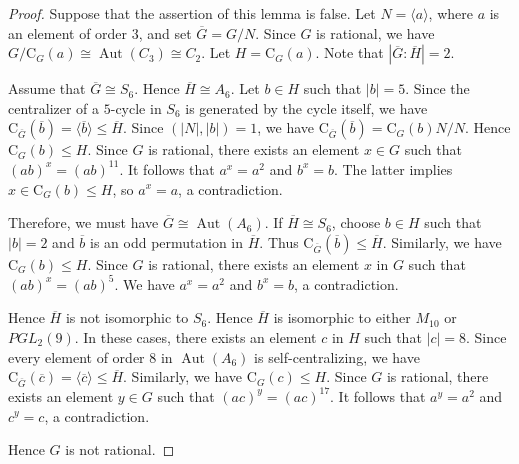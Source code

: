 \documentclass[10pt,a4paper]{amsart}
\providecommand{\Aut}{{\operatorname{Aut}}}
\providecommand{\C}{{\mathrm{C}}}
\providecommand{\gen}[1]{\langle #1 \rangle} %
\providecommand{\olG}{{\overline{G}}}
\providecommand{\olH}{{\overline{H}}}
\providecommand{\olb}{{\overline{b}}}
\providecommand{\olc}{{\overline{c}}}
\begin{document}
\begin{proof}
    Suppose that the assertion of this lemma is false.
    Let $N=\gen{a}$, where $a$ is an element of order $3$,
    and set $\olG=G/N$.
    Since $G$ is rational, we have $G/\C_G(a)\cong \Aut(C_3)\cong C_2$.
    Let $H =\C_G(a)$. Note that $|\olG:\olH|=2$.

    Assume that $\olG \cong S_6$.
    Hence $\olH \cong A_6$.
    Let $b\in H$ such that $|b|=5$.
    Since the centralizer of a $5$-cycle in $S_6$ is generated by the cycle itself,
    we have $\C_{\olG}(\olb)=\gen{\olb}\leq \olH$.
    Since $(|N|,|b|)=1$, we have $\C_{\olG}(\olb)=\C_G(b)N/N$.
    Hence $\C_G(b)\leq H$.
    Since $G$ is rational, 
    there exists an element $x\in G$ such that $(ab)^x=(ab)^{11}$.
    It follows that $a^x=a^2$ and $b^x=b$.
    The latter implies $x\in \C_G(b)\leq H$, so $a^x=a$, a contradiction.

    Therefore, we must have $\olG \cong \Aut(A_6)$.
    If $\olH \cong S_6$, 
    choose $b\in H$ such that $|b|=2$ and $\olb$ is an odd permutation in $\olH$.
    Thus $\C_{\olG}(\olb)\leq \olH$.
    Similarly, we have $\C_G(b)\leq H$.
    Since $G$ is rational, 
    there exists an element $x$ in $G$ such that $(ab)^x=(ab)^5$.
    We have $a^x=a^2$ and $b^x=b$, a contradiction.
    
    Hence $\olH$ is not isomorphic to $S_6$.
    Hence $\olH$ is isomorphic to either $M_{10}$ or $PGL_2(9)$.
    In these cases, there exists an element $c$ in $H$ such that $|c|=8$.
    Since every element of order $8$ in $\Aut(A_6)$ is self-centralizing,
    we have $\C_{\olG}(\olc)=\gen{\olc}\leq \olH$.
    Similarly, we have $\C_G(c)\leq H$.
    Since $G$ is rational, 
    there exists an element $y\in G$ such that $(ac)^y = (ac)^{17}$.
    It follows that $a^y=a^2$ and $c^y=c$, a contradiction.
    
    Hence $G$ is not rational.
\end{proof}
\end{document}
